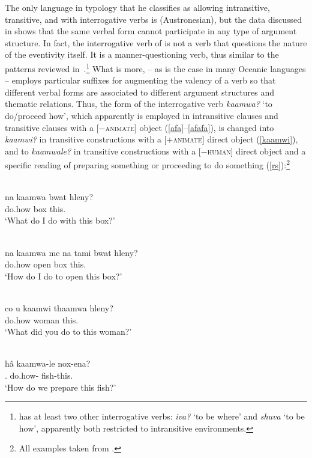 \documentclass[output=paper]{langsci/langscibook}
\begin{document}
The only language in  typology that he classifies as
allowing intransitive, transitive, and  with
interrogative verbs is  (Austronesian), but the data discussed
in \citet{bril2002,bril2004} shows that the same verbal form cannot participate
in any type of argument structure. In fact, the interrogative verb of
 is not a verb that questions the nature of the eventivity
itself. It is a manner-questioning verb, thus similar to the patterns reviewed
in~.\footnote{ has at least two other
interrogative verbs: \emph{iva?} `to be where' and \emph{shuva} `to be how',
apparently both restricted to intransitive environments.} What is more,
 -- as is the case in many Oceanic languages -- employs
particular suffixes for augmenting the valency of a verb so that different
verbal forms are associated to different argument structures and thematic
relations. Thus, the form of the interrogative verb \emph{kaamwa?} `to
do/proceed how', which apparently is employed in intransitive clauses and
transitive clauses with a [$-$\textsc{animate}] object (\ref{afa}--\ref{afafa}), is
changed into \emph{kaamwi?} in transitive constructions with a [+\textsc{animate}]
direct object (\ref{kaamwi}), and to \emph{kaamwale?} in transitive
constructions with a [$-$\textsc{human}] direct object and a specific reading of preparing
something or proceeding to do something (\ref{rs}):\footnote{All examples
taken from \citet[50]{bril2002}.}

\begin{exe}
    \ex \label{afa} \\
\gll na kaamwa	bwat hleny? \\
\Fsg{} do.how box this.\Dei{}\\
\glt `What do I do with this box?'

\ex \label{afafa} \\
\gll na kaamwa	me	na tami bwat hleny?\\
\Fsg{} do.how \Depend{}	\Fsg{} open box this.\Dei{}\\
\glt `How do I do to open this box?'

\ex \label{kaamwi}\\
\gll    co u kaamwi thaamwa hleny?\\
            \Ssg{} \Acc{} do.how woman	this.\Dei{}\\
\glt `What did you do to this woman?'

\ex \label{rs}\\
\gll h\^{a}	kaamwa-le	nox-ena?\\
\Fpl.\Incl{} do.how-\Tr{} fish-this.\Dei{}\\
\glt `How do we prepare this fish?'
\end{exe}
\end{document}
